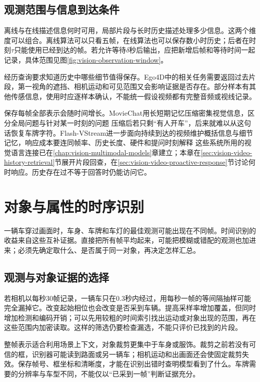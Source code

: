 \subsection{观测范围与信息到达条件}
\label{sec:vision-video-availability}

离线与在线描述信息何时可用，局部片段与长时历史描述处理多少信息。这两个维度可以组合。离线算法可以只看五帧，在线算法也可以保存数小时历史；后者在时刻$\tau$只能使用已经到达的帧。若允许等待$\delta$秒后输出，应把新增后帧和等待时间一起记录，具体范围见图\ref{fig:vision-observation-window}。

经历查询要求知道历史中哪些细节值得保存。Ego4D中的相关任务需要返回过去片段，第一视角的遮挡、相机运动和可见范围又会影响证据是否存在。部分样本有其他传感信息，使用时应逐样本确认，不能统一假设视频都有完整音频或视线记录。

保存每帧全部表示会随时间增长。MovieChat用长短期记忆压缩密集视觉信息，区分全局问题与针对某一时刻的问题 压缩后若只剩“有人开车”，后来就难以从这句话恢复车牌字符。Flash-VStream进一步面向持续到达的视频维护概括信息与细节记忆，响应成本要连同帧率、历史长度、硬件和提问时刻解释 这些系统所用的视觉语言连接已在\ref{chap:vision-multimodal-models}章建立；本章在\ref{sec:vision-video-history-retrieval}节展开片段回查，在\ref{sec:vision-video-proactive-response}节讨论何时响应。历史存在过不等于回答时仍能访问它。

\section{对象与属性的时序识别}
\label{sec:vision-video-object-recognition}

一辆车穿过画面时，车身、车牌和车灯的最佳观测可能出现在不同帧。时间识别的收益来自这些互补证据。直接把所有帧平均起来，可能把模糊或错配的观测也加进来；必须先确定取什么、是否属于同一对象，再决定怎样汇总。

\subsection{观测与对象证据的选择}
\label{sec:vision-video-evidence-selection}

若相机以每秒30帧记录，一辆车只在0.3秒内经过，用每秒一帧的等间隔抽样可能完全漏掉它。改变起始相位也会改变是否采到车辆。提高采样率增加覆盖，但同时增加检测和编码开销；可以先用较粗的时间索引找出运动或对象出现的范围，再在这些范围内加密读取。这样的筛选仍要检查漏选，不能只评价已找到的片段。

整帧表示适合利用场景上下文，对象裁剪更集中于车身或服饰。裁剪之前若没有可信的框，识别器可能读到路面或另一辆车；相机运动和出画面还会使固定裁剪失效。保存帧号、框坐标和清晰度，才能在识别出错时查明模型看到了什么。车牌需要的分辨率与车型不同，不能仅以“已采到一帧”判断证据充分。

